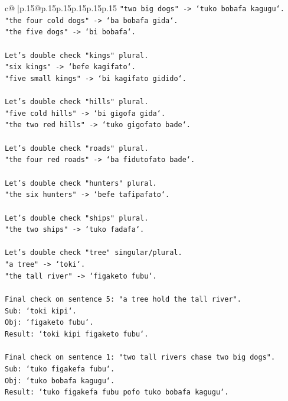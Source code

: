 \documentclass{article}
\begin{document}
{\begin{supertabular}{c@{$\;$}|p{.15\linewidth}@{}p{.15\linewidth}p{.15\linewidth}p{.15\linewidth}p{.15\linewidth}p{.15\linewidth}}
{{{\texttt{"two big dogs" {-}> `tuko bobafa kagugu`.} \\
\texttt{"the four cold dogs" {-}> `ba bobafa gida`.} \\
\texttt{"the five dogs" {-}> `bi bobafa`.} \\
\\ 
\texttt{Let's double check "kings" plural.} \\
\texttt{"six kings" {-}> `befe kagifato`.} \\
\texttt{"five small kings" {-}> `bi kagifato gidido`.} \\
\\ 
\texttt{Let's double check "hills" plural.} \\
\texttt{"five cold hills" {-}> `bi gigofa gida`.} \\
\texttt{"the two red hills" {-}> `tuko gigofato bade`.} \\
\\ 
\texttt{Let's double check "roads" plural.} \\
\texttt{"the four red roads" {-}> `ba fidutofato bade`.} \\
\\ 
\texttt{Let's double check "hunters" plural.} \\
\texttt{"the six hunters" {-}> `befe tafipafato`.} \\
\\ 
\texttt{Let's double check "ships" plural.} \\
\texttt{"the two ships" {-}> `tuko fadafa`.} \\
\\ 
\texttt{Let's double check "tree" singular/plural.} \\
\texttt{"a tree" {-}> `toki`.} \\
\texttt{"the tall river" {-}> `figaketo fubu`.} \\
\\ 
\texttt{Final check on sentence 5: "a tree hold the tall river".} \\
\texttt{Sub: `toki kipi`.} \\
\texttt{Obj: `figaketo fubu`.} \\
\texttt{Result: `toki kipi figaketo fubu`.} \\
\\ 
\texttt{Final check on sentence 1: "two tall rivers chase two big dogs".} \\
\texttt{Sub: `tuko figakefa fubu`.} \\
\texttt{Obj: `tuko bobafa kagugu`.} \\
\texttt{Result: `tuko figakefa fubu pofo tuko bobafa kagugu`.} \\
}}}
\end{supertabular}}
\end{document}
